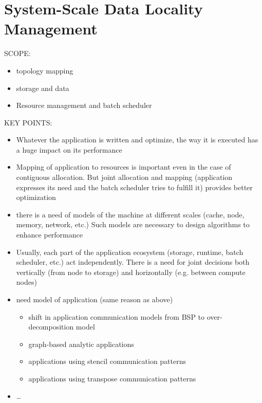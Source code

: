 \chapter{System-Scale Data Locality Management}
\label{ch:systemscale}







SCOPE:

\begin{itemize}
\item topology mapping
\item storage and data
\item Resource management and batch scheduler
\end{itemize}

KEY POINTS:
\begin{itemize}
\item Whatever the application is written and optimize, the way it is executed
  has a huge impact on its performance
 \item Mapping of application to resources is important even in the case of
   contiguous allocation. But joint allocation and mapping  (application
   expresses its need and the batch scheduler tries to fulfill it) provides
   better optimization
\item there is a need of models of the machine at different scales (cache, node,
memory, network, etc.) Such models are necessary to design algorithms to enhance
performance
  \item Usually, each part of the application ecosystem (storage, runtime, batch
    scheduler, etc.) act independently. There is a need for joint decisions both
    vertically (from node to storage) and horizontally (e.g. between compute
    nodes)
\item need model of application (same reason as above)
\begin{itemize}
\item shift in application communication models from BSP to over-decomposition model
\item graph-based analytic applications
\item applications using stencil communication patterns
\item applications using transpose communication patterns
\end{itemize}
\item \ldots
\end{itemize}

